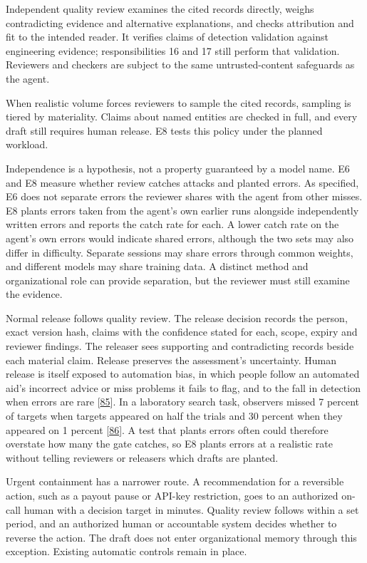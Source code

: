\documentclass[
  11pt,
]{article}
\begin{document}
Independent quality review examines the cited records directly, weighs
contradicting evidence and alternative explanations, and checks
attribution and fit to the intended reader. It verifies claims of
detection validation against engineering evidence; responsibilities 16
and 17 still perform that validation. Reviewers and checkers are subject
to the same untrusted-content safeguards as the agent.

When realistic volume forces reviewers to sample the cited records,
sampling is tiered by materiality. Claims about named entities are
checked in full, and every draft still requires human release. E8 tests
this policy under the planned workload.

Independence is a hypothesis, not a property guaranteed by a model name.
E6 and E8 measure whether review catches attacks and planted errors. As
specified, E6 does not separate errors the reviewer shares with the
agent from other misses. E8 plants errors taken from the agent's own
earlier runs alongside independently written errors and reports the
catch rate for each. A lower catch rate on the agent's own errors would
indicate shared errors, although the two sets may also differ in
difficulty. Separate sessions may share errors through common weights,
and different models may share training data. A distinct method and
organizational role can provide separation, but the reviewer must still
examine the evidence.

Normal release follows quality review. The release decision records the
person, exact version hash, claims with the confidence stated for each,
scope, expiry and reviewer findings. The releaser sees supporting and
contradicting records beside each material claim. Release preserves the
assessment's uncertainty. Human release is itself exposed to automation
bias, in which people follow an automated aid's incorrect advice or miss
problems it fails to flag, and to the fall in detection when errors are
rare {[}\protect\hyperlink{ref-ParasuramanManzey2010}{85}{]}. In a
laboratory search task, observers missed 7 percent of targets when
targets appeared on half the trials and 30 percent when they appeared on
1 percent {[}\protect\hyperlink{ref-Wolfe2005Rare}{86}{]}. A test that
plants errors often could therefore overstate how many the gate catches,
so E8 plants errors at a realistic rate without telling reviewers or
releasers which drafts are planted.

Urgent containment has a narrower route. A recommendation for a
reversible action, such as a payout pause or API-key restriction, goes
to an authorized on-call human with a decision target in minutes.
Quality review follows within a set period, and an authorized human or
accountable system decides whether to reverse the action. The draft does
not enter organizational memory through this exception. Existing
automatic controls remain in place.
\end{document}
